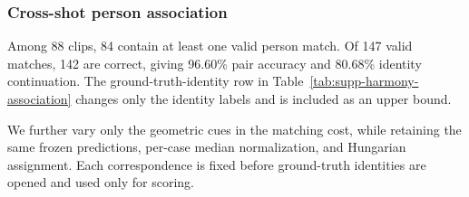 \subsubsection{Cross-shot person association}
\label{app:harmony-association}

Among 88 clips, 84 contain at least one valid person match. Of 147 valid
matches, 142 are correct, giving 96.60\% pair accuracy and 80.68\% identity
continuation. The ground-truth-identity row in
Table~\ref{tab:supp-harmony-association} changes only the identity labels and
is included as an upper bound.

\begin{table}[t]
  \centering
  \caption{Cross-shot person association on Harmony4D. Pair accuracy uses
  147 evaluator-valid endpoint pairs, whereas identity continuation uses all
  176 ground-truth continuations. The ground-truth-identity row changes only
  identity labels and serves as an evaluation upper bound.}
  \label{tab:supp-harmony-association}
  \supptablesize
  
\end{table}

We further vary only the geometric cues in the matching cost, while retaining
the same frozen predictions, per-case median normalization, and Hungarian
assignment. Each correspondence is fixed before ground-truth identities are
opened and used only for scoring.

\begin{table}[t]
  \centering
  \caption{Association-cue ablation on 88 Harmony4D cases. Pair accuracy uses
  evaluator-valid endpoint matches for each configuration, identity
  continuation uses all 176 cross-shot ground-truth continuations, and IDF1
  is averaged over the 88 cases.}
  \label{tab:supp-harmony-association-cues}
  \supptablesize
  
\end{table}

